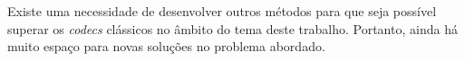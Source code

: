 Existe uma necessidade de desenvolver outros métodos para que seja possível superar os \textit{codecs} clássicos no âmbito do tema deste trabalho. Portanto, ainda há muito espaço para novas soluções no problema abordado.

